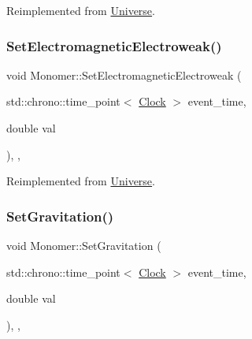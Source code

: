 Reimplemented from \mbox{\hyperlink{classUniverse_aa981fc7e252b1fbbb675f0371860954d}{Universe}}.

\mbox{\label{classMonomer_aa034728b74053ed3df452ddc8f1b46e8}} 
\subsubsection{\texorpdfstring{Set\+Electromagnetic\+Electroweak()}{SetElectromagneticElectroweak()}}
{\footnotesize\ttfamily void Monomer\+::\+Set\+Electromagnetic\+Electroweak (\begin{DoxyParamCaption}\item[{std\+::chrono\+::time\+\_\+point$<$ \mbox{\hyperlink{universe_8h_a0ef8d951d1ca5ab3cfaf7ab4c7a6fd80}{Clock}} $>$}]{event\+\_\+time,  }\item[{double}]{val }\end{DoxyParamCaption})\hspace{0.3cm}{\ttfamily [inline]}, {\ttfamily [final]}, {\ttfamily [virtual]}}



Reimplemented from \mbox{\hyperlink{classUniverse_a608aa95698380f791a0ffba45cc1bee3}{Universe}}.

\mbox{\label{classMonomer_ab38d44b27a46d5630aeb5e889f927c09}} 
\subsubsection{\texorpdfstring{Set\+Gravitation()}{SetGravitation()}}
{\footnotesize\ttfamily void Monomer\+::\+Set\+Gravitation (\begin{DoxyParamCaption}\item[{std\+::chrono\+::time\+\_\+point$<$ \mbox{\hyperlink{universe_8h_a0ef8d951d1ca5ab3cfaf7ab4c7a6fd80}{Clock}} $>$}]{event\+\_\+time,  }\item[{double}]{val }\end{DoxyParamCaption})\hspace{0.3cm}{\ttfamily [inline]}, {\ttfamily [final]}, {\ttfamily [virtual]}}



